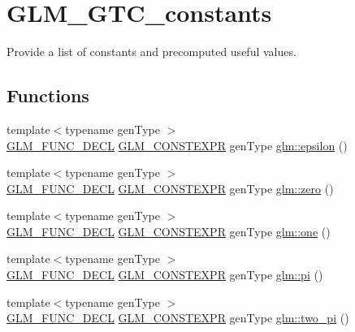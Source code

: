 \hypertarget{group__gtc__constants}{}\section{G\+L\+M\+\_\+\+G\+T\+C\+\_\+constants}
\label{group__gtc__constants}


Provide a list of constants and precomputed useful values.  


\subsection*{Functions}
\begin{DoxyCompactItemize}
\item 
{\footnotesize template$<$typename gen\+Type $>$ }\\\mbox{\hyperlink{setup_8hpp_ab2d052de21a70539923e9bcbf6e83a51}{G\+L\+M\+\_\+\+F\+U\+N\+C\+\_\+\+D\+E\+CL}} \mbox{\hyperlink{setup_8hpp_a08b807947b47031d3a511f03f89645ad}{G\+L\+M\+\_\+\+C\+O\+N\+S\+T\+E\+X\+PR}} gen\+Type \mbox{\hyperlink{group__gtc__constants_ga2a1e57fc5592b69cfae84174cbfc9429}{glm\+::epsilon}} ()
\item 
{\footnotesize template$<$typename gen\+Type $>$ }\\\mbox{\hyperlink{setup_8hpp_ab2d052de21a70539923e9bcbf6e83a51}{G\+L\+M\+\_\+\+F\+U\+N\+C\+\_\+\+D\+E\+CL}} \mbox{\hyperlink{setup_8hpp_a08b807947b47031d3a511f03f89645ad}{G\+L\+M\+\_\+\+C\+O\+N\+S\+T\+E\+X\+PR}} gen\+Type \mbox{\hyperlink{group__gtc__constants_ga788f5a421fc0f40a1296ebc094cbaa8a}{glm\+::zero}} ()
\item 
{\footnotesize template$<$typename gen\+Type $>$ }\\\mbox{\hyperlink{setup_8hpp_ab2d052de21a70539923e9bcbf6e83a51}{G\+L\+M\+\_\+\+F\+U\+N\+C\+\_\+\+D\+E\+CL}} \mbox{\hyperlink{setup_8hpp_a08b807947b47031d3a511f03f89645ad}{G\+L\+M\+\_\+\+C\+O\+N\+S\+T\+E\+X\+PR}} gen\+Type \mbox{\hyperlink{group__gtc__constants_ga39c2fb227631ca25894326529bdd1ee5}{glm\+::one}} ()
\item 
{\footnotesize template$<$typename gen\+Type $>$ }\\\mbox{\hyperlink{setup_8hpp_ab2d052de21a70539923e9bcbf6e83a51}{G\+L\+M\+\_\+\+F\+U\+N\+C\+\_\+\+D\+E\+CL}} \mbox{\hyperlink{setup_8hpp_a08b807947b47031d3a511f03f89645ad}{G\+L\+M\+\_\+\+C\+O\+N\+S\+T\+E\+X\+PR}} gen\+Type \mbox{\hyperlink{group__gtc__constants_ga94bafeb2a0f23ab6450fed1f98ee4e45}{glm\+::pi}} ()
\item 
{\footnotesize template$<$typename gen\+Type $>$ }\\\mbox{\hyperlink{setup_8hpp_ab2d052de21a70539923e9bcbf6e83a51}{G\+L\+M\+\_\+\+F\+U\+N\+C\+\_\+\+D\+E\+CL}} \mbox{\hyperlink{setup_8hpp_a08b807947b47031d3a511f03f89645ad}{G\+L\+M\+\_\+\+C\+O\+N\+S\+T\+E\+X\+PR}} gen\+Type \mbox{\hyperlink{group__gtc__constants_gaa5276a4617566abcfe49286f40e3a256}{glm\+::two\+\_\+pi}} ()

\end{DoxyCompactItemize}
